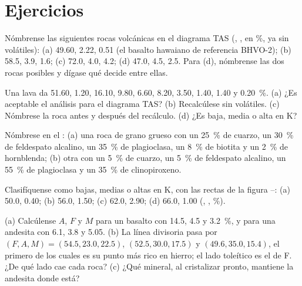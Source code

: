 \section{Ejercicios}

\begin{exercise}[$\star$]\label{exo:b2:magmatic-series:1}
Nómbrense las siguientes rocas volcánicas en el diagrama TAS (, , 
en \unit{\percent}, ya sin volátiles): (a) 49.60, 2.22, 0.51 (el basalto hawaiano
de referencia BHVO-2); (b) 58.5, 3.9, 1.6; (c) 72.0, 4.0, 4.2; (d) 47.0, 4.5, 2.5.
Para (d), nómbrense las dos rocas posibles y dígase qué decide entre ellas.
\end{exercise}

\begin{exercise}[$\star$]\label{exo:b2:magmatic-series:2}
Una lava da  51.60,  1.20,  16.10,  9.80,
 6.60,  8.20,  3.50,  1.40,  1.40 y
 \qty{0.20}{\percent}. (a) ¿Es aceptable el análisis para el diagrama TAS?
(b) Recalcúlese sin volátiles. (c) Nómbrese la roca antes y después del
recálculo. (d) ¿Es baja, media o alta en K?
\end{exercise}

\begin{exercise}[$\star$]\label{exo:b2:magmatic-series:3}
Nómbrese en el : (a) una roca de grano grueso con un \qty{25}{\percent} de cuarzo,
un \qty{30}{\percent} de feldespato alcalino, un \qty{35}{\percent} de plagioclasa, un \qty{8}{\percent} de
biotita y un \qty{2}{\percent} de hornblenda; (b) otra con un \qty{5}{\percent} de cuarzo,
un \qty{5}{\percent} de feldespato alcalino, un \qty{55}{\percent} de plagioclasa y un
\qty{35}{\percent} de clinopiroxeno.
\end{exercise}

\begin{exercise}[$\star$]\label{exo:b2:magmatic-series:4}
Clasifíquense como bajas, medias o altas en K, con las rectas de la figura --:
(a) 50.0, 0.40; (b) 56.0, 1.50; (c) 62.0, 2.90; (d) 66.0, 1.00 (,
, \unit{\percent}).
\end{exercise}

\begin{exercise}[$\star\star$]\label{exo:b2:magmatic-series:5}
(a) Calcúlense $A$, $F$ y $M$ para un basalto con  14.5,  4.5 y
 \qty{3.2}{\percent}, y para una andesita con 6.1, 3.8 y 5.05.
(b) La línea divisoria pasa por $(F, A, M) = (54.5, 23.0, 22.5)$, $(52.5, 30.0,
17.5)$ y $(49.6, 35.0, 15.4)$, el primero de los cuales es su punto más rico en hierro; el
lado toleítico es el de F. ¿De qué lado cae cada roca? (c) ¿Qué
mineral, al cristalizar pronto, mantiene la andesita donde está?
\end{exercise}

